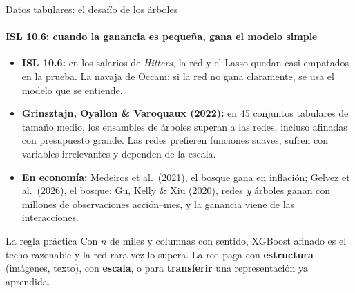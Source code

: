 \documentclass{beamer}
\newcommand{\1}{\mathbb{I}}
\begin{document}
\begin{frame}{Datos tabulares: el desafío de los árboles}
\framesubtitle{ISL 10.6: cuando la ganancia es pequeña, gana el modelo simple}
\small
\begin{itemize}\itemsep3pt
  \item \textbf{ISL 10.6:} en los salarios de \emph{Hitters}, la red y el Lasso quedan casi empatados en la prueba. La navaja de Occam: si la red no gana claramente, se usa el modelo que se entiende. \pause
  \item \textbf{Grinsztajn, Oyallon \& Varoquaux (2022):} en 45 conjuntos tabulares de tamaño medio, los ensambles de árboles superan a las redes, incluso afinadas con presupuesto grande. Las redes prefieren funciones suaves, sufren con variables irrelevantes y dependen de la escala. \pause
  \item \textbf{En economía:} Medeiros et al.\ (2021), el bosque gana en inflación; Gelvez et al.\ (2026), el bosque; Gu, Kelly \& Xiu (2020), redes \emph{y} árboles ganan con millones de observaciones acción--mes, y la ganancia viene de las interacciones. \pause
\end{itemize}
\vspace{0.05cm}
\begin{block}{La regla práctica}
Con $n$ de miles y columnas con sentido, XGBoost afinado es el techo razonable y la red rara vez lo supera. La red paga con \textbf{estructura} (imágenes, texto), con \textbf{escala}, o para \textbf{transferir} una representación ya aprendida.
\end{block}
\end{frame}
\end{document}
